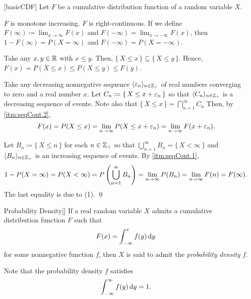\documentclass[../complex_variables_1.tex]{subfiles}
\begin{document}
\begin{Lemma}{}[basicCDF]
    Let \(F\) be a cumulative distribution function of a random variable \(X\).
    \begin{enumerate}[label=(\arabic*), ref=\protect{\Cref{lem:basicCDF} (\arabic*)}]
        \ii
        \(F\) is monotone increasing.
        \ii
        \(F\) is right-continuous.
        \ii
        If we define \(F(\infty) \coloneqq \lim_{x\to\infty}F(x)\) and \(F(-\infty) = \lim_{x \to
        -\infty} F(x)\), then \(1 - F(\infty) = P(X = \infty)\) and \(F(-\infty) = P(X =
        -\infty)\).
    \end{enumerate}
\end{Lemma}
\begin{myclaim}[Proof]\hfill
\begin{enumerate}[label=(\arabic*)]
    \ii
    Take any \(x, y \in \RR\) with \(x \le y\).
    Then, \(\{\,X \le x\,\} \subseteq \{\,X \le y\,\}\).
    Hence, \(F(x) = P(X \le x) \le P(X \le y) \le F(y)\).

    \ii
    Take any decreasing nonnegative sequence \(\lang \veps_n \rang_{n \in \ZZ_+}\)
    of real numbers converging to zero and a real number \(x\).
    Let \(C_n \coloneqq \{\,X \le x + \varepsilon_n \,\}\)
    so that \(\lang C_n \rang_{n \in \ZZ_+}\) is a decreasing sequence of events.
    Note also that \(\{\,X \le x\,\} = \bigcap_{n=1}^\infty C_n\)
    Then, by \ref{itm:seqCont.2},
    \[
        F(x) = P(X \le x) = \lim_{n \to \infty} P(X \le x + \varepsilon_n) = \lim_{n \to \infty} F(x +
        \varepsilon_n)\text.
    \]

    \ii
    Let \(B_n \coloneqq \{\,X \le n\,\}\) for each \(n \in \ZZ_+\)
    so that \(\bigcup_{n=1}^\infty B_n = \{\,X < \infty\,\}\)
    and \(\lang B_n \rang_{n \in \ZZ_+}\) is an increasing sequence of events.
    By \ref{itm:seqCont.1},
    \[
        1 - P(X = \infty) = P(X < \infty)
        = P \left( \bigcup_{n=1}^\infty B_n \right)
        = \lim_{n\to\infty} P(B_n) = \lim_{n\to\infty} F(n) = F(\infty)\text.
    \]
    The last equality is due to (1).
    \qed
\end{enumerate}
\end{myclaim}

\begin{Definition}{Probability Density}[]
    If a real random variable \(X\) admits a cumulative distribution function \(F\) such that
    \[
        F(x) = \int_{-\infty}^x f(y) \,\mathrm{d} y
    \]
    for some nonnegative function \(f\), then \(X\) is said to admit the
    \emph{probability density} \(f\).
\end{Definition}

\begin{note}
    Note that the probability density \(f\) satisfies
    \[
        \int_{-\infty}^\infty f(y) \,\mathrm{d} y = 1\text.
    \]
\end{note}
\end{document}
